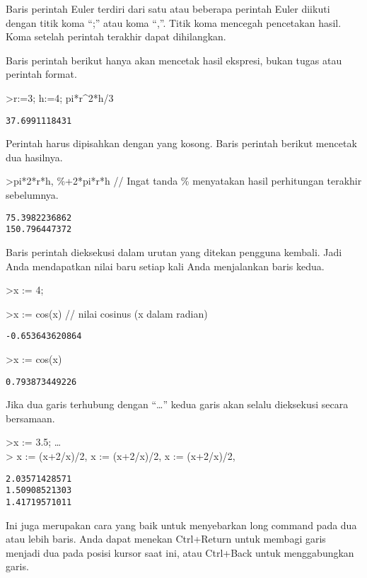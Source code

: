 \documentclass[
]{book}
\begin{document}
Baris perintah Euler terdiri dari satu atau beberapa perintah Euler diikuti dengan titik koma ``;'' atau koma ``,''. Titik koma mencegah pencetakan hasil. Koma setelah perintah terakhir dapat dihilangkan.

Baris perintah berikut hanya akan mencetak hasil ekspresi, bukan tugas atau perintah format.

\textgreater r:=3; h:=4; pi*r\^{}2*h/3

\begin{verbatim}
37.6991118431
\end{verbatim}

Perintah harus dipisahkan dengan yang kosong. Baris perintah berikut mencetak dua hasilnya.

\textgreater pi*2*r*h, \%+2*pi*r*h // Ingat tanda \% menyatakan hasil perhitungan terakhir sebelumnya.

\begin{verbatim}
75.3982236862
150.796447372
\end{verbatim}

Baris perintah dieksekusi dalam urutan yang ditekan pengguna kembali. Jadi Anda mendapatkan nilai baru setiap kali Anda menjalankan baris kedua.

\textgreater x := 4;

\textgreater x := cos(x) // nilai cosinus (x dalam radian)

\begin{verbatim}
-0.653643620864
\end{verbatim}

\textgreater x := cos(x)

\begin{verbatim}
0.793873449226
\end{verbatim}

Jika dua garis terhubung dengan ``\ldots{}'' kedua garis akan selalu dieksekusi secara bersamaan.

\textgreater x := 3.5; \ldots{}\\
\textgreater{} x := (x+2/x)/2, x := (x+2/x)/2, x := (x+2/x)/2,

\begin{verbatim}
2.03571428571
1.50908521303
1.41719571011
\end{verbatim}

Ini juga merupakan cara yang baik untuk menyebarkan long command pada dua atau lebih baris. Anda dapat menekan Ctrl+Return untuk membagi garis menjadi dua pada posisi kursor saat ini, atau Ctrl+Back untuk menggabungkan garis.
\end{document}
